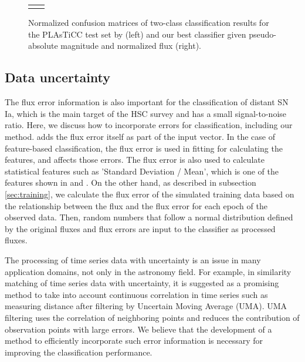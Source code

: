 \documentclass[proof]{pasj01}
\begin{document}
\begin{figure}[htbp]
\begin{tabular}{cc}
\begin{minipage}{0.5\hsize}
\begin{center}
            \end{center}
        \end{minipage}
    \end{tabular}  \caption{%
    Normalized confusion matrices of two-class classification results for the PLAsTiCC test set by \citet{boone19a} (left) and our best classifier given pseudo-absolute magnitude and normalized flux (right).
    }%
    \label{fig:comp_plasticc_1st}
\end{figure}
%
%
%
%
\subsection{Data uncertainty}
%
The flux error information is also important for the classification of distant SN Ia, which is the main target of the HSC survey and has a small signal-to-noise ratio.
Here, we discuss how to incorporate errors for classification, including our method.
\citet{charnock17a} adds the flux error itself as part of the input vector.
In the case of feature-based classification, the flux error is used in fitting for calculating the features, and affects those errors.
The flux error is also used to calculate statistical features such as 'Standard Deviation / Mean', which is one of the features shown in \citet{narayan18a} and \citet{Muthukrishna_2019}.
On the other hand, as described in subsection \ref{sec:training}, we calculate the flux error of the simulated training data based on the relationship between the flux and the flux error for each epoch of the observed data.
Then, random numbers that follow a normal distribution defined by the original fluxes and flux errors are input to the classifier as processed fluxes.

The processing of time series data with uncertainty is an issue in many application domains, not only in the astronomy field.
For example, in similarity matching of time series data with uncertainty, it is suggested as a promising method to take into account continuous correlation in time series such as measuring distance after filtering by Uncertain Moving Average (UMA)\citep{Dallachiesa_2012}.
UMA filtering uses the correlation of neighboring points and reduces the contribution of observation points with large errors.
We believe that the development of a method to efficiently incorporate such error information is necessary for improving the classification performance.
%
\end{document}

